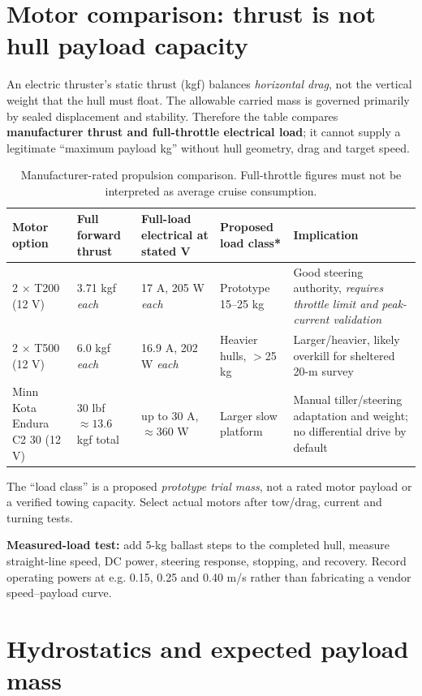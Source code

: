 \documentclass[10pt,a4paper]{article}
\begin{document}
\section{Motor comparison: thrust is not hull payload capacity}
An electric thruster's static thrust (kgf) balances \emph{horizontal drag}, not the vertical weight that the hull must float. The allowable carried mass is governed primarily by sealed displacement and stability. Therefore the table compares \textbf{manufacturer thrust and full-throttle electrical load}; it cannot supply a legitimate ``maximum payload kg'' without hull geometry, drag and target speed.
\begin{table}[H]\centering\scriptsize
\caption{Manufacturer-rated propulsion comparison. Full-throttle figures must not be interpreted as average cruise consumption.}
\begin{tabularx}{\linewidth}{@{}L{2.4cm}L{2.25cm}L{2.2cm}L{1.85cm}Y@{}}\toprule
Motor option & Full forward thrust & Full-load electrical at stated V & Proposed load class* & Implication\\ $\times$ T200 (12 V) \cite{T200} & 3.71 kgf \emph{each} & 17 A, 205 W \emph{each} & Prototype 15--25 kg & Good steering authority, \emph{requires throttle limit and peak-current validation}\\
2 $\times$ T500 (12 V) \cite{T500} & 6.0 kgf \emph{each} & 16.9 A, 202 W \emph{each} & Heavier hulls, $>$25 kg & Larger/heavier, likely overkill for sheltered 20-m survey\\
Minn Kota Endura C2 30 (12 V) \cite{MinnKota} & 30 lbf $\approx13.6$ kgf total & up to 30 A, $\approx360$ W & Larger slow platform & Manual tiller/steering adaptation and weight; no differential drive by default\\\bottomrule\end{tabularx}\end{table}
{\footnotesize *The ``load class'' is a proposed \emph{prototype trial mass}, not a rated motor payload or a verified towing capacity. Select actual motors after tow/drag, current and turning tests.\par}
\textbf{Measured-load test:} add 5-kg ballast steps to the completed hull, measure straight-line speed, DC power, steering response, stopping, and recovery. Record operating powers at e.g. 0.15, 0.25 and 0.40 m/s rather than fabricating a vendor speed--payload curve.

\section{Hydrostatics and expected payload mass}
\end{document}

